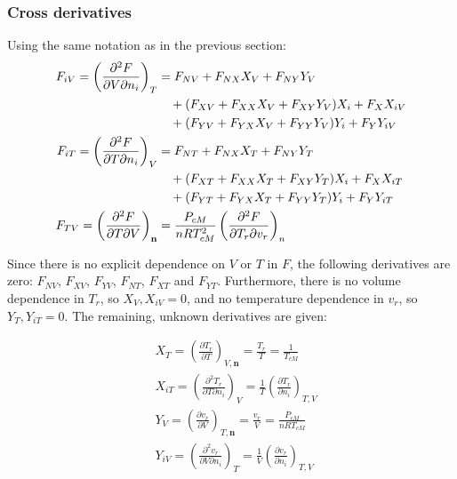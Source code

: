 \documentclass[internal,english]{sintefmemo2012}
\numberwithin{equation}{section}
\newcommand*{\pder}[2]{\left(\frac{\partial #1}{\partial #2}\right)}
\newcommand*{\pdcross}[3]{\left(\frac{\partial^2 #1}{\partial #2 \partial #3}\right)}
\begin{document}
\subsubsection*{Cross derivatives}
Using the same notation as in the previous section:
\begin{align}
  \phantom{F_{iV} = \pdcross{F}{V}{n_i}_{T}}
  \label{eq:F_iV}
  & \begin{aligned}
    \mathllap{F_{iV} = \pdcross{F}{V}{n_i}_{T}}
    & =  F_{NV} + F_{NX}X_{V} + F_{NY}Y_{V}  \\
    & \quad + (F_{X V} + F_{XX} X_{V} + F_{XY} Y_{V}) X_{i} + F_{X}X_{iV} \\
    & \quad + (F_{Y V} + F_{YX} X_{V} + F_{YY} Y_{V}) Y_{i} + F_{Y}Y_{iV}
  \end{aligned} \\
  \label{eq:F_iT}
  & \begin{aligned}
    \mathllap{F_{iT} = \pdcross{F}{T}{n_i}_{V}}
    & =  F_{NT} + F_{NX}X_{T} + F_{NY}Y_{T}  \\
    & \quad + (F_{X T} + F_{XX} X_{T} + F_{XY} Y_{T}) X_{i} + F_{X}X_{iT} \\
	& \quad + (F_{Y T} + F_{YX} X_{T} + F_{YY} Y_{T}) Y_{i} + F_{Y}Y_{iT}
  \end{aligned} \\
  \label{F_TV}
  & \begin{aligned}
    \mathllap{F_{TV} = \pdcross{F}{T}{V}_\textbf{n}}
    & = \frac{P_{cM}}{n R T_{cM}^2} \pdcross{F}{T_r}{v_r}_{n} 
  \end{aligned}
\end{align}

Since there is no explicit dependence on $V$ or $T$ in $F$, the following derivatives are zero: $F_{NV}$, $F_{X V}$, $F_{Y V}$, $F_{NT}$, $F_{X T}$ and $F_{Y T}$. Furthermore, there is no volume dependence in $T_r$, so $X_V , X_{iV} = 0$, and no temperature dependence in $v_r$, so $Y_T , Y_{iT} = 0$. The remaining, unknown derivatives are given:

\begin{align}
& X_T = \pder{T_r}{T}_{V,\textbf{n}} = \frac{T_r}{T} = \frac{1}{T_{cM}}\\
& X_{iT} = \pdcross{T_r}{T}{n_i}_{V} = \frac{1}{T} \pder{T_r}{n_i}_{T,V} \\
& Y_V = \pder{v_r}{V}_{T,\textbf{n}} = \frac{v_r}{V} = \frac{P_{cM}}{n R T_{cM}}\\
& Y_{iV} = \pdcross{v_r}{V}{n_i}_{T} = \frac{1}{V} \pder{v_r}{n_i}_{T,V} 
\end{align}
\end{document}
